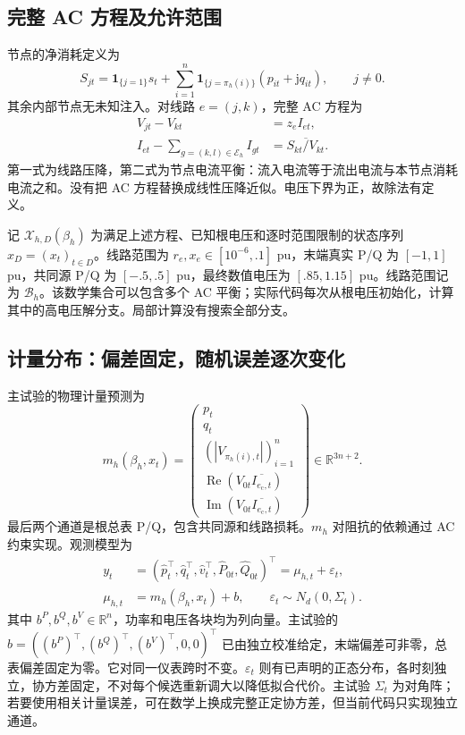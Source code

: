 \documentclass[UTF8,fontset=fandol,11pt,a4paper]{ctexart}
\newcommand{\R}{\mathbb R}
\begin{document}
\subsection{完整 AC 方程及允许范围}
节点的净消耗定义为
\begin{equation}
 S_{jt}=\mathbf1_{\{j=1\}}s_t+
 \sum_{i=1}^n\mathbf1_{\{j=\pi_h(i)\}}(p_{it}+\mathrm jq_{it}),
 \qquad j\ne0 .
 \label{eq:nodalS}
\end{equation}
其余内部节点无未知注入。对线路 $e=(j,k)$，完整 AC 方程为
\begin{align}
 V_{jt}-V_{kt}&=z_eI_{et},\label{eq:ac}\\
 I_{et}-\sum_{g=(k,l)\in\mathcal E_h}I_{gt}
   &=\overline{S_{kt}/V_{kt}}.\label{eq:kcl}
\end{align}
第一式为线路压降，第二式为节点电流平衡：流入电流等于流出电流与本节点消耗电流之和。没有把 AC 方程替换成线性压降近似。电压下界为正，故除法有定义。

记 $\mathcal X_{h,D}(\beta_h)$ 为满足上述方程、已知根电压和逐时范围限制的状态序列 $x_D=(x_t)_{t\in D}$。线路范围为 $r_e,x_e\in[10^{-6},.1]$ pu，末端真实 P/Q 为 $[-1,1]$ pu，共同源 P/Q 为 $[-.5,.5]$ pu，最终数值电压为 $[.85,1.15]$ pu。线路范围记为 $\mathcal B_h$。该数学集合可以包含多个 AC 平衡；实际代码每次从根电压初始化，计算其中的高电压解分支。局部计算没有搜索全部分支。

\subsection{计量分布：偏差固定，随机误差逐次变化}
主试验的物理计量预测为
\begin{equation}
m_h(\beta_h,x_t)=
\begin{pmatrix}
p_t\\q_t\\(|V_{\pi_h(i),t}|)_{i=1}^n\\
\operatorname{Re}(V_{0t}\overline{I_{e_{\mathrm c},t}})\\
\operatorname{Im}(V_{0t}\overline{I_{e_{\mathrm c},t}})
\end{pmatrix}\in\R^{3n+2}.
\label{eq:metermean}
\end{equation}
最后两个通道是根总表 P/Q，包含共同源和线路损耗。$m_h$ 对阻抗的依赖通过 AC 约束实现。观测模型为
\begin{align}
 y_t&=(\widehat p_t^\top,\widehat q_t^\top,\widehat v_t^\top,
           \widehat P_{0t},\widehat Q_{0t})^\top
       =\mu_{h,t}+\varepsilon_t,\label{eq:obs}\\
 \mu_{h,t}&=m_h(\beta_h,x_t)+b,\qquad
 \varepsilon_t\sim N_d(0,\Sigma_t).\label{eq:noise}
\end{align}
其中 $b^P,b^Q,b^V\in\R^n$，功率和电压各块均为列向量。主试验的 $b=((b^P)^\top,(b^Q)^\top,(b^V)^\top,0,0)^\top$ 已由独立校准给定，末端偏差可非零，总表偏差固定为零。它对同一仪表跨时不变。$\varepsilon_t$ 则有已声明的正态分布，各时刻独立，协方差固定，不对每个候选重新调大以降低拟合代价。主试验 $\Sigma_t$ 为对角阵；若要使用相关计量误差，可在数学上换成完整正定协方差，但当前代码只实现独立通道。
\end{document}
